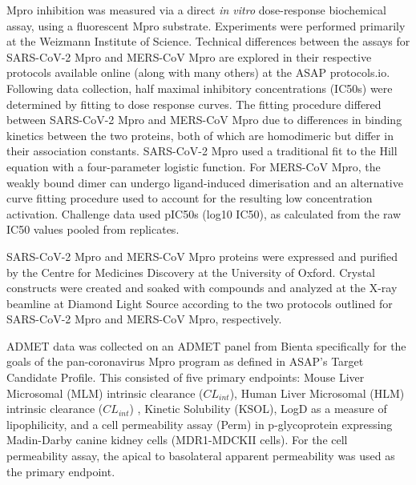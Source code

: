 \documentclass[journal=jcim,manuscript=article]{achemso}
\begin{document}
Mpro inhibition was measured via a direct \textit{in vitro} dose-response biochemical assay, using a fluorescent Mpro substrate. Experiments were performed primarily at the Weizmann Institute of Science. Technical differences between the assays for SARS-CoV-2 Mpro\cite{sars_mpro_dose_response_protocol} and MERS-CoV Mpro\cite{mers_mpro_dose_response_protocol} are explored in their respective protocols available online (along with many others) at the ASAP protocols.io\cite{asap_protocols_io}. Following data collection, half maximal inhibitory concentrations (IC50s) were determined by fitting to dose response curves. The fitting procedure differed between SARS-CoV-2 Mpro and MERS-CoV Mpro due to differences in binding kinetics between the two proteins, both of which are homodimeric but differ in their association constants. SARS-CoV-2 Mpro used a traditional fit to the Hill equation\cite{Hill_eq_1910} with a four-parameter logistic function. For MERS-CoV Mpro, the weakly bound dimer can undergo ligand-induced dimerisation and an alternative curve fitting procedure used to account for the resulting low concentration activation. Challenge data used pIC50s (log10 IC50), as calculated from the raw IC50 values pooled from replicates. 

SARS-CoV-2 Mpro and MERS-CoV Mpro proteins were expressed and purified by the Centre for Medicines Discovery at the University of Oxford. Crystal constructs were created and soaked with compounds and analyzed at the X-ray beamline at Diamond Light Source according to the two protocols outlined for SARS-CoV-2 Mpro\cite{sars_mpro_crystal_protocol} and MERS-CoV Mpro, respectively\cite{mers_mpro_crystal_protocol}. 

ADMET data was collected on an ADMET panel from Bienta specifically for the goals of the pan-coronavirus Mpro program as defined in ASAP’s Target Candidate Profile\cite{sars_mers_tcp}. This consisted of five primary endpoints: Mouse Liver Microsomal (MLM) intrinsic clearance ($CL_{int}$), Human Liver Microsomal (HLM) intrinsic clearance ($CL_{int}$) \cite{hlm_mlm_assay_protcol}, Kinetic Solubility (KSOL)\cite{ksol_assay_protocol}, LogD as a measure of lipophilicity\cite{logD_assay_protocol}, and a cell permeability assay (Perm) in p-glycoprotein expressing Madin-Darby canine kidney cells (MDR1-MDCKII cells)\cite{perm_assay_protocol}. For the cell permeability assay, the apical to basolateral apparent permeability was used as the primary endpoint.
\end{document}
